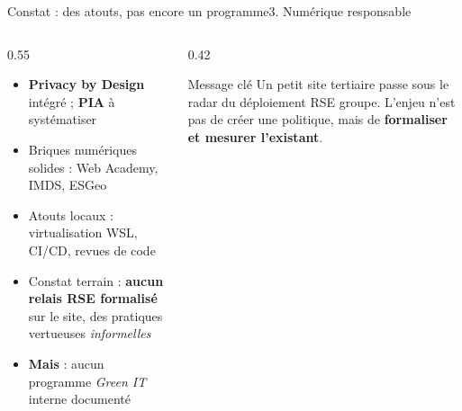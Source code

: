\documentclass[aspectratio=169,french,12pt]{beamer}
\begin{document}
\begin{frame}{Constat : des atouts, pas encore un programme}{3. Numérique responsable}
\begin{columns}[T]
  \begin{column}{0.55\textwidth}
    \begin{itemize}
      \item \textbf{Privacy by Design} intégré ; \textbf{PIA} à systématiser
      \item Briques numériques solides : Web Academy, IMDS, ESGeo
      \item Atouts locaux : virtualisation WSL, CI/CD, revues de code
      \item Constat terrain : \textbf{aucun relais RSE formalisé} sur le site, des pratiques vertueuses \textit{informelles}
      \item \alert{\textbf{Mais} : aucun programme \textit{Green IT} interne documenté}
    \end{itemize}
  \end{column}
  \begin{column}{0.42\textwidth}
    \begin{alertblock}{Message clé}
      Un petit site tertiaire passe sous le radar du déploiement RSE groupe. L'enjeu n'est pas de créer une politique, mais de \textbf{formaliser et mesurer l'existant}.
    \end{alertblock}
  \end{column}
\end{columns}
\end{frame}
\end{document}
